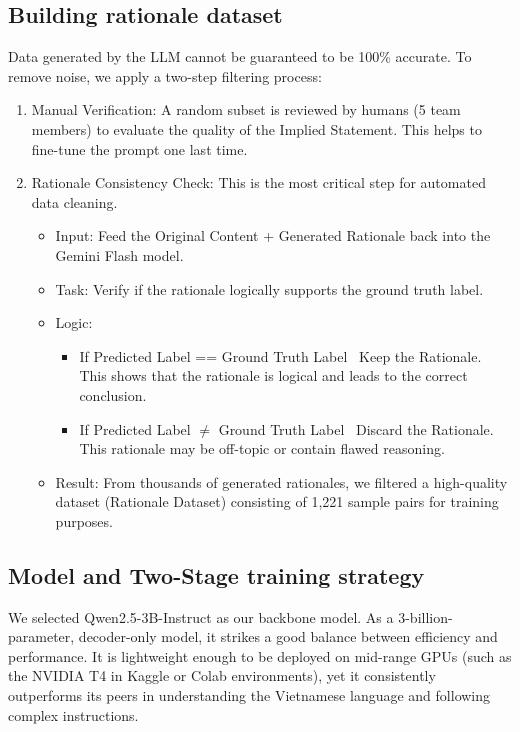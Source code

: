 \documentclass[11pt]{article}
\begin{document}
\subsection{Building rationale dataset}
Data generated by the LLM cannot be guaranteed to be 100\% accurate. To remove noise, we
apply a two-step filtering process:
\begin{enumerate}[leftmargin=*]
\item Manual Verification: A random subset is reviewed by humans (5 team members) to
evaluate the quality of the Implied Statement. This helps to fine-tune the prompt one
last time.
\item Rationale Consistency Check: This is the most critical step for automated data cleaning.
\begin{itemize}[leftmargin=*]
    \item Input: Feed the Original Content + Generated Rationale back into the Gemini Flash model.
    \item Task: Verify if the rationale logically supports the ground truth label.
    \item Logic:
\begin{itemize}[leftmargin=*]
\item If Predicted Label == Ground Truth Label \textrightarrow\ Keep the
Rationale. This shows that the rationale is logical and leads to the correct
conclusion.
\item If Predicted Label $\ne$ Ground Truth Label \textrightarrow\ Discard the Rationale. This
rationale may be off-topic or contain flawed reasoning.
\end{itemize}
\item Result: From thousands of generated rationales, we filtered a high-quality
dataset (Rationale Dataset) consisting of 1,221 sample pairs for training purposes.
\end{itemize}
\end{enumerate}

\subsection{Model and Two-Stage training strategy}
We selected Qwen2.5-3B-Instruct as our backbone model. As a 3-billion-parameter,
decoder-only model, it strikes a good balance between efficiency and performance. It is
lightweight enough to be deployed on mid-range GPUs (such as the NVIDIA T4 in Kaggle or
Colab environments), yet it consistently outperforms its peers in understanding the
Vietnamese language and following complex instructions.
\end{document}
